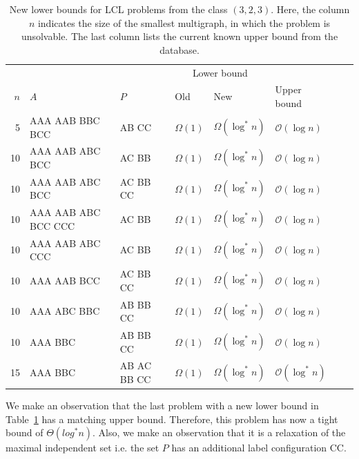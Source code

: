 \begin{table}[H]
    \centering
    \begin{adjustbox}{width={\textwidth},keepaspectratio}%
    \begin{tabular}{rlllllll}
        \toprule
        &&& \multicolumn{2}{c}{Lower bound} \\
        \cmidrule{4-5}
        $n$ & $A$ & $P$ & Old & New & Upper bound\\
        \midrule
        5  & AAA AAB BBC BCC     & AB CC       & $\Omega(1)$ & $\Omega(\log^*n)$ & $\mathcal{O}(\log n)$\\
        10 & AAA AAB ABC BCC     & AC BB       & $\Omega(1)$ & $\Omega(\log^*n)$ & $\mathcal{O}(\log n)$\\
        10 & AAA AAB ABC BCC     & AC BB CC    & $\Omega(1)$ & $\Omega(\log^*n)$ & $\mathcal{O}(\log n)$\\
        10 & AAA AAB ABC BCC CCC & AC BB       & $\Omega(1)$ & $\Omega(\log^*n)$ & $\mathcal{O}(\log n)$\\
        10 & AAA AAB ABC CCC     & AC BB       & $\Omega(1)$ & $\Omega(\log^*n)$ & $\mathcal{O}(\log n)$\\
        10 & AAA AAB BCC         & AC BB CC    & $\Omega(1)$ & $\Omega(\log^*n)$ & $\mathcal{O}(\log n)$\\
        10 & AAA ABC BBC         & AB BB CC    & $\Omega(1)$ & $\Omega(\log^*n)$ & $\mathcal{O}(\log n)$\\
        10 & AAA BBC             & AB BB CC    & $\Omega(1)$ & $\Omega(\log^*n)$ & $\mathcal{O}(\log n)$\\
        15 & AAA BBC             & AB AC BB CC & $\Omega(1)$ & $\Omega(\log^*n)$ & $\mathcal{O}(\log^* n)$\\
        \bottomrule
    \end{tabular}
    \end{adjustbox}
    \caption{%
    New lower bounds for LCL problems from the class $(3,2,3)$.
    Here, the column $n$ indicates the size of the smallest multigraph, in which the problem is unsolvable.
    The last column lists the current known upper bound from the database.
    }
    \label{tbl:results:asd2}
\end{table}
We make an observation that the last problem with a new lower bound in Table~\ref{tbl:results:asd2} has a matching upper bound.
Therefore, this problem has now a tight bound of $\Theta(log^* n)$.
Also, we make an observation that it is a relaxation of the maximal independent set i.e. the set $P$ has an additional label configuration CC.

